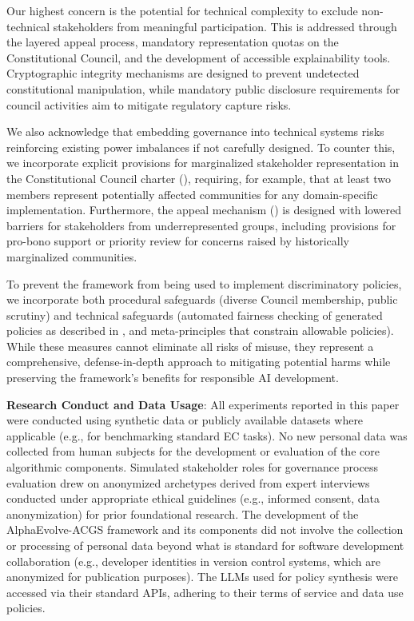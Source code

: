 \documentclass[manuscript,screen,review,anonymous,9pt]{acmart}
\begin{document}
Our highest concern is the potential for technical complexity to exclude non-technical stakeholders from meaningful participation. This is addressed through the layered appeal process, mandatory representation quotas on the Constitutional Council, and the development of accessible explainability tools. Cryptographic integrity mechanisms are designed to prevent undetected constitutional manipulation, while mandatory public disclosure requirements for council activities aim to mitigate regulatory capture risks.

We also acknowledge that embedding governance into technical systems risks reinforcing existing power imbalances if not carefully designed. To counter this, we incorporate explicit provisions for marginalized stakeholder representation in the Constitutional Council charter (), requiring, for example, that at least two members represent potentially affected communities for any domain-specific implementation. Furthermore, the appeal mechanism () is designed with lowered barriers for stakeholders from underrepresented groups, including provisions for pro-bono support or priority review for concerns raised by historically marginalized communities.

To prevent the framework from being used to implement discriminatory policies, we incorporate both procedural safeguards (diverse Council membership, public scrutiny) and technical safeguards (automated fairness checking of generated policies as described in , and meta-principles that constrain allowable policies). While these measures cannot eliminate all risks of misuse, they represent a comprehensive, defense-in-depth approach to mitigating potential harms while preserving the framework's benefits for responsible AI development.

\textbf{Research Conduct and Data Usage}:
All experiments reported in this paper were conducted using synthetic data or publicly available datasets where applicable (e.g., for benchmarking standard EC tasks). No new personal data was collected from human subjects for the development or evaluation of the core algorithmic components. Simulated stakeholder roles for governance process evaluation drew on anonymized archetypes derived from expert interviews conducted under appropriate ethical guidelines (e.g., informed consent, data anonymization) for prior foundational research. The development of the AlphaEvolve-ACGS framework and its components did not involve the collection or processing of personal data beyond what is standard for software development collaboration (e.g., developer identities in version control systems, which are anonymized for publication purposes). The LLMs used for policy synthesis were accessed via their standard APIs, adhering to their terms of service and data use policies.
\end{document}
